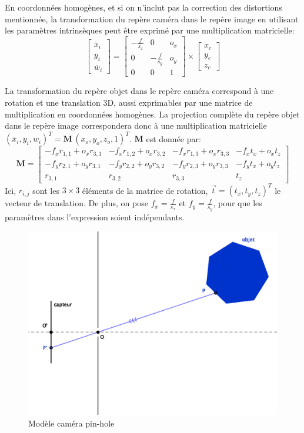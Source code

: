 \documentclass[a4paper,10pt]{scrreprt}
\begin{document}
En coordonnées homogènes, et si on n'inclut pas la correction des distortions mentionnée, la transformation du repère caméra dans le repère image en utilisant les paramètres intrinsèques peut être exprimé par une multiplication matricielle:
\begin{equation} \label{eq:cam_to_img}
	\begin{bmatrix}
		\ddot{x_i} \\
		\ddot{y_i} \\
		\ddot{w_i}
	\end{bmatrix} = \begin{bmatrix}
		-\frac{f}{s_x} & 0 & o_x \\
		0 & -\frac{f}{s_y} & o_y \\
		0 & 0 & 1
	\end{bmatrix} \times \begin{bmatrix}
		x_c \\
		y_c \\
		z_c
	\end{bmatrix}
\end{equation}

La transformation du repère objet dans le repère caméra correspond à une rotation et une translation 3D, aussi exprimables par une matrice de multiplication en coordonnées homogènes. La projection complète du repère objet dans le repère image correspondera donc à une multiplication matricielle $(\ddot{x_i}, \ddot{y_i}, \ddot{w_i})^T = \mathbf{M} \, (x_o, y_o, z_o, 1)^T$. $\mathbf{M}$ est donnée par:
\begin{equation}
	\mathbf{M} = \begin{bmatrix}
		-f_x r_{1,1} + o_x r_{3,1} & -f_x r_{1,2} + o_x r_{3,2} & -f_x r_{1,3} + o_x r_{3,3} & -f_x t_x + o_x t_z \\
		-f_y r_{2,1} + o_y r_{3,1} & -f_y r_{2,2} + o_y r_{3,2} & -f_y r_{2,3} + o_y r_{3,3} & -f_y t_x + o_y t_z \\
		r_{3,1} & r_{3,2} & r_{3,3} & t_z
	\end{bmatrix}
\end{equation}
Ici, $r_{i,j}$ sont les $3 \times 3$ éléments de la matrice de rotation, $\vec{t} = (t_x, t_y, t_z)^T$ le vecteur de translation. De plus, on pose $f_x = \frac{f}{s_x}$ et $f_y = \frac{f}{s_y}$, pour que les paramètres dans l'expression soient indépendants.

\begin{figure}[p]
\center
\includegraphics[width=.6\textwidth]{pinhole.eps}
\caption{Modèle caméra pin-hole}
\label{fig:pinhole}
\end{figure}
\end{document}
